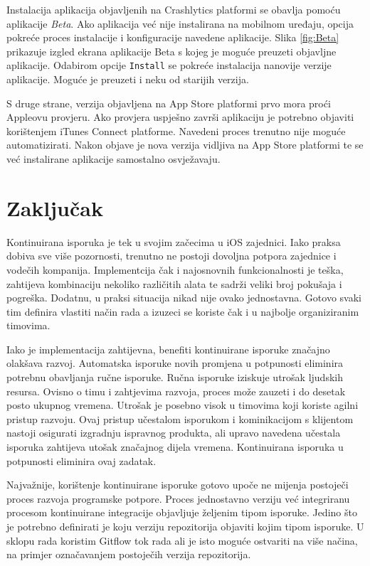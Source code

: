 \documentclass[times, utf8, diplomski, numeric]{fer}
\begin{document}
Instalacija aplikacija objavljenih na Crashlytics platformi se obavlja pomoću aplikacije \textit{Beta}. Ako aplikacija već nije  instalirana na mobilnom uređaju, opcija pokreće proces instalacije i konfiguracije navedene aplikacije. Slika \ref{fig:Beta} prikazuje izgled ekrana aplikacije Beta s kojeg je moguće preuzeti objavljne aplikacije. Odabirom opcije \verb|Install| se pokreće instalacija nanovije verzije aplikacije. Moguće je preuzeti i neku od starijih verzija.

S druge strane, verzija objavljena na App Store platformi prvo mora proći Appleovu provjeru. Ako provjera uspješno završi aplikaciju je potrebno objaviti korištenjem iTunes Connect platforme. Navedeni proces trenutno nije moguće automatizirati. Nakon objave je nova verzija vidljiva na App Store platformi te se već instalirane aplikacije samostalno osvježavaju.

\chapter{Zaključak}

Kontinuirana isporuka je tek u svojim začecima u iOS zajednici. Iako praksa dobiva sve više pozornosti, trenutno ne postoji dovoljna potpora zajednice i vodečih kompanija. Implementcija čak i najosnovnih funkcionalnosti je teška, zahtijeva kombinaciju nekoliko različitih alata te sadrži veliki broj pokušaja i pogreška. Dodatnu, u praksi situacija nikad nije ovako jednostavna. Gotovo svaki tim definira vlastiti način rada a izuzeci se koriste čak i u najbolje organiziranim timovima.

Iako je implementacija zahtijevna, benefiti kontinuirane isporuke značajno olakšava razvoj. Automatska isporuke novih promjena u potpunosti eliminira potrebnu obavljanja ručne isporuke. Ručna isporuke iziskuje utrošak ljudskih resursa. Ovisno o timu i zahtjevima razvoja, proces može zauzeti i do desetak posto ukupnog vremena. Utrošak je posebno visok u timovima koji koriste agilni pristup razvoju. Ovaj pristup učestalom isporukom i kominikacijom s klijentom nastoji osigurati izgradnju ispravnog produkta, ali upravo navedena učestala isporuka zahtijeva utošak značajnog dijela vremena. Kontinuirana isporuka u potpunosti eliminira ovaj zadatak.

Najvažnije, korištenje kontinuirane isporuke gotovo upoče ne mijenja postoječi proces razvoja programske potpore. Proces jednostavno verziju već integriranu procesom kontinuirane integracije objavljuje željenim tipom isporuke. Jedino što je potrebno definirati je koju verziju repozitorija objaviti kojim tipom isporuke. U sklopu rada koristim Gitflow tok rada ali je isto moguće ostvariti na više načina, na primjer označavanjem postoječih verzija repozitorija.
\end{document}
